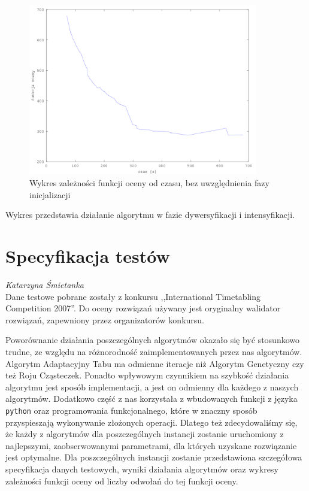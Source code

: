 \begin{figure}[H]
  
  \centering
    \includegraphics[width=10cm]{szczegolowy2_instancja.png}
    \caption{Wykres zależności funkcji oceny od czasu, bez uwzględnienia fazy inicjalizacji}
\end{figure}
Wykres przedstawia działanie algorytmu w fazie dywersyfikacji i intensyfikacji.
\section{Specyfikacja testów}
\textit{Katarzyna Śmietanka} 
\\
Dane testowe pobrane zostały z konkursu ,,International Timetabling Competition 2007''. Do oceny rozwiązań używany jest oryginalny walidator rozwiązań, zapewniony przez organizatorów konkursu.
\par Poworównanie działania poszczególnych algorytmów okazało się być stosunkowo trudne, ze względu na różnorodność zaimplementowanych przez nas algorytmów. Algorytm Adaptacyjny Tabu ma odmienne iteracje niż Algorytm Genetyczny czy też Roju Cząsteczek. Ponadto wpływowym czynnikiem na szybkość działania algorytmu jest sposób implementacji, a jest on odmienny dla każdego z naszych algorytmów. Dodatkowo część z nas korzystała z wbudowanych funkcji z języka \verb#python# oraz programowania funkcjonalnego, które w znaczny sposób przyspieszają wykonywanie złożonych operacji. Dlatego też zdecydowaliśmy się, że każdy z algorytmów dla poszczególnych instancji zostanie uruchomiony z najlepszymi, zaobserwowanymi parametrami, dla których uzyskane rozwiązanie jest optymalne. Dla poszczególnych instancji zostanie przedstawiona szczegółowa specyfikacja danych testowych, wyniki działania algorytmów oraz wykresy zależności funkcji oceny od liczby odwołań do tej funkcji oceny.
